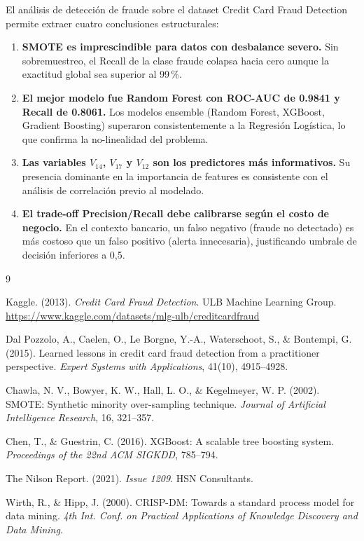 \documentclass[12pt, a4paper]{article}
\begin{document}
El análisis de detección de fraude sobre el dataset Credit Card Fraud
Detection permite extraer cuatro conclusiones estructurales:

\begin{enumerate}
  \item \textbf{SMOTE es imprescindible para datos con desbalance severo.}
        Sin sobremuestreo, el Recall de la clase fraude colapsa hacia cero
        aunque la exactitud global sea superior al 99\,\%.

  \item \textbf{El mejor modelo fue Random Forest con ROC-AUC de 0.9841
        y Recall de 0.8061.} Los modelos ensemble (Random Forest,
        XGBoost, Gradient Boosting) superaron consistentemente a la
        Regresión Logística, lo que confirma la no-linealidad del problema.

  \item \textbf{Las variables $V_{14}$, $V_{17}$ y $V_{12}$ son los
        predictores más informativos.} Su presencia dominante en la
        importancia de features es consistente con el análisis de
        correlación previo al modelado.

  \item \textbf{El trade-off Precision/Recall debe calibrarse según el
        costo de negocio.} En el contexto bancario, un falso negativo
        (fraude no detectado) es más costoso que un falso positivo
        (alerta innecesaria), justificando umbrale de decisión inferiores
        a 0{,}5.
\end{enumerate}

\begin{thebibliography}{9}

Kaggle. (2013). \textit{Credit Card Fraud Detection}. ULB Machine Learning Group.
\url{https://www.kaggle.com/datasets/mlg-ulb/creditcardfraud}

Dal Pozzolo, A., Caelen, O., Le Borgne, Y.-A., Waterschoot, S., \&
Bontempi, G. (2015). Learned lessons in credit card fraud detection from a
practitioner perspective. \textit{Expert Systems with Applications},
41(10), 4915--4928.

Chawla, N. V., Bowyer, K. W., Hall, L. O., \& Kegelmeyer, W. P. (2002).
SMOTE: Synthetic minority over-sampling technique.
\textit{Journal of Artificial Intelligence Research}, 16, 321--357.

Chen, T., \& Guestrin, C. (2016). XGBoost: A scalable tree boosting system.
\textit{Proceedings of the 22nd ACM SIGKDD}, 785--794.

The Nilson Report. (2021). \textit{Issue 1209}. HSN Consultants.

Wirth, R., \& Hipp, J. (2000). CRISP-DM: Towards a standard process model
for data mining. \textit{4th Int. Conf. on Practical Applications of
Knowledge Discovery and Data Mining}.

\end{thebibliography}
\end{document}
